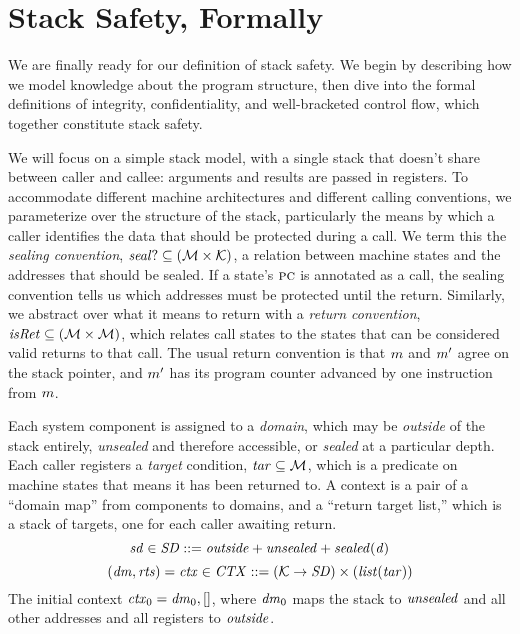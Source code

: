 \documentclass[acmsmall,review,anonymous]{acmart}\settopmatter{printfolios=true,printccs=false,printacmref=false}
\begin{document}
{\section{Stack Safety, Formally}
\label{sec:lse}

We are finally ready for our definition of stack safety. We begin
by describing how we model knowledge about the program structure,
then dive into the formal definitions of integrity, confidentiality, and
well-bracketed control flow, which together constitute stack safety.

We will focus on a simple stack model, with a single stack
that doesn't share between caller and callee: arguments and results are passed
in registers. To accommodate different machine architectures and different calling
conventions, we parameterize over the structure of the stack, particularly
the means by
which a caller identifies the data that should be protected during a call. We term
this the {\em sealing convention},
\(\mathit{seal?} \subseteq ({\mathcal M} \times {\mathcal K})\),
a relation between machine states and the addresses that should be sealed.
If a state's \(\textsc{pc}\) is annotated as a call, the sealing convention tells us
which addresses must be protected until the return. Similarly, we abstract over what
it means to return with a {\em return convention},
\(\mathit{isRet} \subseteq ({\mathcal M} \times {\mathcal M})\),
which relates call states to the states that can be considered valid returns to that call.
The usual return convention is that \(m\) and \(m'\) agree on the stack pointer,
and \(m'\) has its program counter advanced by one instruction from \(m\).

Each system component is assigned to a {\em domain}, which may be {\em outside}
of the stack entirely, {\em unsealed} and therefore accessible, or {\em sealed}
at a particular depth. Each caller registers a {\em target}
condition, \(\mathit{tar} \subseteq {\mathcal M}\), which is a predicate on machine states that means it
has been returned to.
A context is a pair of a ``domain map'' from components to domains, and a
``return target list,'' which is a stack of targets, one for each caller awaiting
return.
%
\[\mathit{sd} \in \mathit{SD} ::= \mathit{outside} + \mathit{unsealed} + \mathit{sealed(d)}\]
\[(\mathit{dm},\mathit{rts}) = \mathit{ctx} \in \mathit{CTX} ::= ({\mathcal K} \rightarrow \mathit{SD})
  \times (\mathit{list} (\mathit{tar})) \]
%
The initial context \(\mathit{ctx}_0 = \mathit{dm}_0, []\), where \(\mathit{dm}_0\) maps
the stack to \(\mathit{unsealed}\) and all other addresses and all registers to \(\mathit{outside}\).

}
\end{document}
